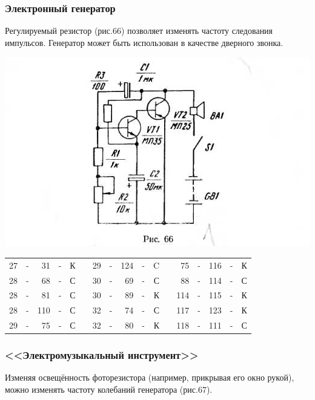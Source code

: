 \documentclass[12pt]{article}
\begin{document}
\hrulefill

\subsubsection{Электронный генератор}

Регулируемый резистор (рис.66) позволяет изменять частоту следования импульсов. Генератор может быть использован в качестве дверного звонка.

\newpage


\includegraphics[scale=1, angle=0]{ekon3_066_1}

\hrulefill

\begin{tabular}{r c r c r p{2cm} r c r c r p{2cm} r c r c r}
27 & - &  31 & - & К &     & 29 & - & 124 & - & C &    &  75 & - & 116  & - & К\\
28 & - &  68 & - & С &     & 30 & - &  69 & - & С &    &  88 & - & 114  & - & С\\
28 & - &  81 & - & С &     & 30 & - &  89 & - & К &    & 114 & - & 115  & - & К\\
28 & - & 110 & - & С &     & 32 & - &  74 & - & С &    & 117 & - & 123  & - & К\\
29 & - &  75 & - & С &     & 32 & - &  80 & - & К &    & 118 & - & 111  & - & С\\
\end{tabular}

\hrulefill

\subsubsection{ <<Электромузыкальный инструмент>>}

Изменяя освещённость фоторезистора (например, прикрывая его окно рукой), можно изменять частоту колебаний генератора (рис.67).
\end{document}
